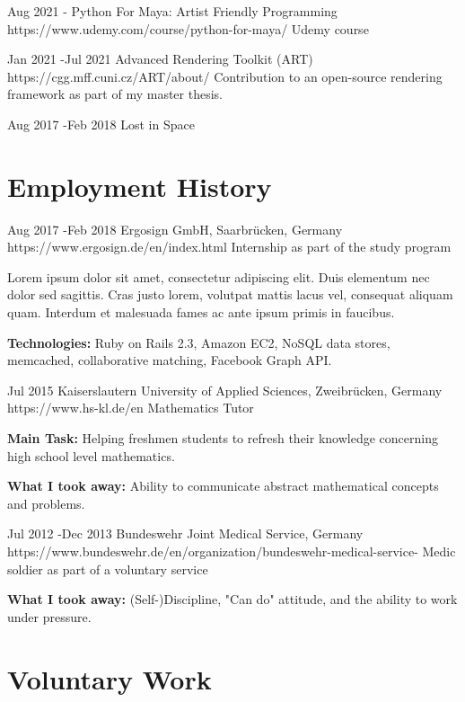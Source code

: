 \documentclass[10pt]{article} %
\begin{document}
\job
{Aug 2021 -}{}
{Python For Maya: Artist Friendly Programming}
{https://www.udemy.com/course/python-for-maya/}
{Udemy course}
{}

\job
{Jan 2021 -}{Jul 2021}
{Advanced Rendering Toolkit (ART)}
{https://cgg.mff.cuni.cz/ART/about/}
{Contribution to an open-source rendering framework as part of my master thesis.}
{}

\job
{Aug 2017 -}{Feb 2018}
{Lost in Space}
{}
{}
{}


\section{Employment History}

\job
{Aug 2017 -}{Feb 2018}
{Ergosign GmbH, Saarbrücken, Germany}
{https://www.ergosign.de/en/index.html}
{Internship as part of the study program}
{Lorem ipsum dolor sit amet, consectetur adipiscing elit. Duis elementum nec dolor sed sagittis. Cras justo lorem, volutpat mattis lacus vel, consequat aliquam quam. Interdum et malesuada fames ac ante ipsum primis in faucibus.\\
\rule{0mm}{5mm}\textbf{Technologies:} Ruby on Rails 2.3, Amazon EC2, NoSQL data stores, memcached, collaborative matching, Facebook Graph API.}


\job
{Jul 2015}
{}
{Kaiserslautern University of Applied Sciences, Zweibrücken, Germany}
{https://www.hs-kl.de/en}
{Mathematics Tutor}
{\rule{0mm}{2mm}\textbf{Main Task:} Helping freshmen students to refresh their knowledge concerning high school level mathematics. \\
\rule{0mm}{5mm}\textbf{What I took away:} Ability to communicate abstract mathematical concepts and problems.}


\job
{Jul 2012 -}{Dec 2013}
{Bundeswehr Joint Medical Service, Germany}
{https://www.bundeswehr.de/en/organization/bundeswehr-medical-service-}
{Medic soldier as part of a voluntary service}
{\rule{0mm}{2mm}\textbf{What I took away:} (Self-)Discipline, "Can do" attitude, and the ability to work under pressure.}


\section{Voluntary Work}


\end{document}
